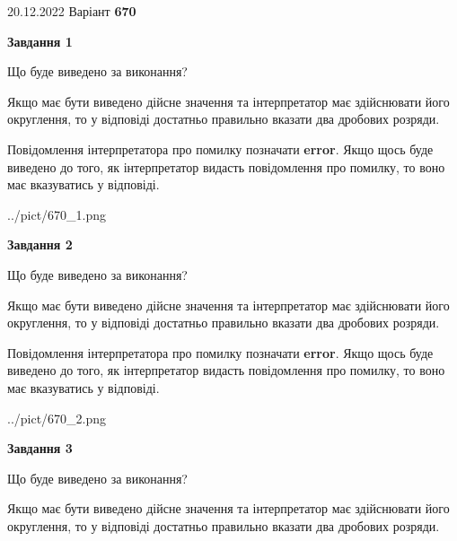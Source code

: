 \documentclass[12pt, ukrainian]{article}
\begin{document}
{20.12.2022 Варіант \No \textbf { 670 }\par}
{
\begin {Large}

{\begin {center}\textbf{Завдання 1}\end {center}}\par
Що буде виведено за виконання? \par

Якщо має бути виведено дійсне значення та інтерпретатор має здійснювати його округлення, 
то у відповіді достатньо правильно вказати два дробових розряди.

Повідомлення інтерпретатора про помилку позначати \textbf{error}.
Якщо щось буде виведено до того, як інтерпретатор видасть повідомлення про помилку, 
то воно має вказуватись у відповіді. \par

\begin{center}
	{../pict/670_1.png}
\end{center}
\newpage

{\begin {center}\textbf{Завдання 2}\end {center}}\par
Що буде виведено за виконання? \par

Якщо має бути виведено дійсне значення та інтерпретатор має здійснювати його округлення, 
то у відповіді достатньо правильно вказати два дробових розряди.

Повідомлення інтерпретатора про помилку позначати \textbf{error}.
Якщо щось буде виведено до того, як інтерпретатор видасть повідомлення про помилку, 
то воно має вказуватись у відповіді. \par

\begin{center}
	{../pict/670_2.png}
\end{center}
\newpage

{\begin {center}\textbf{Завдання 3}\end {center}}\par
Що буде виведено за виконання? \par

Якщо має бути виведено дійсне значення та інтерпретатор має здійснювати його округлення, 
то у відповіді достатньо правильно вказати два дробових розряди.


\end{Large}}
\end{document}
